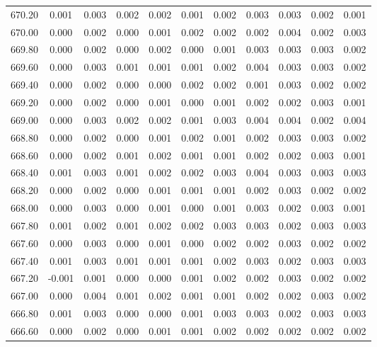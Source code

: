 \begin{longtable}{cccccccccc}
    670.20 &  0.001 &  0.003 &  0.002 &  0.002 &  0.001 &  0.002 &  0.003 &  0.003 &  0.002 &  0.001 \\
    670.00 &  0.000 &  0.002 &  0.000 &  0.001 &  0.002 &  0.002 &  0.002 &  0.004 &  0.002 &  0.003 \\
    669.80 &  0.000 &  0.002 &  0.000 &  0.002 &  0.000 &  0.001 &  0.003 &  0.003 &  0.003 &  0.002 \\
    669.60 &  0.000 &  0.003 &  0.001 &  0.001 &  0.001 &  0.002 &  0.004 &  0.003 &  0.003 &  0.002 \\
    669.40 &  0.000 &  0.002 &  0.000 &  0.000 &  0.002 &  0.002 &  0.001 &  0.003 &  0.002 &  0.002 \\
    669.20 &  0.000 &  0.002 &  0.000 &  0.001 &  0.000 &  0.001 &  0.002 &  0.002 &  0.003 &  0.001 \\
    669.00 &  0.000 &  0.003 &  0.002 &  0.002 &  0.001 &  0.003 &  0.004 &  0.004 &  0.002 &  0.004 \\
    668.80 &  0.000 &  0.002 &  0.000 &  0.001 &  0.002 &  0.001 &  0.002 &  0.003 &  0.003 &  0.002 \\
    668.60 &  0.000 &  0.002 &  0.001 &  0.002 &  0.001 &  0.001 &  0.002 &  0.002 &  0.003 &  0.001 \\
    668.40 &  0.001 &  0.003 &  0.001 &  0.002 &  0.002 &  0.003 &  0.004 &  0.003 &  0.003 &  0.003 \\
    668.20 &  0.000 &  0.002 &  0.000 &  0.001 &  0.001 &  0.001 &  0.002 &  0.003 &  0.002 &  0.002 \\
    668.00 &  0.000 &  0.003 &  0.000 &  0.001 &  0.000 &  0.001 &  0.003 &  0.002 &  0.003 &  0.001 \\
    667.80 &  0.001 &  0.002 &  0.001 &  0.002 &  0.002 &  0.003 &  0.003 &  0.002 &  0.003 &  0.003 \\
    667.60 &  0.000 &  0.003 &  0.000 &  0.001 &  0.000 &  0.002 &  0.002 &  0.003 &  0.002 &  0.002 \\
    667.40 &  0.001 &  0.003 &  0.001 &  0.001 &  0.001 &  0.002 &  0.003 &  0.002 &  0.003 &  0.003 \\
    667.20 & -0.001 &  0.001 &  0.000 &  0.000 &  0.001 &  0.002 &  0.002 &  0.003 &  0.002 &  0.002 \\
    667.00 &  0.000 &  0.004 &  0.001 &  0.002 &  0.001 &  0.001 &  0.002 &  0.002 &  0.003 &  0.002 \\
    666.80 &  0.001 &  0.003 &  0.000 &  0.000 &  0.001 &  0.003 &  0.003 &  0.002 &  0.003 &  0.003 \\
    666.60 &  0.000 &  0.002 &  0.000 &  0.001 &  0.001 &  0.002 &  0.002 &  0.002 &  0.002 &  0.002 \\

\end{longtable}
